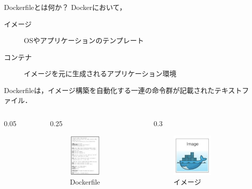 \documentclass[dvipdfmx, 12pt]{beamer}
\newlength{\mytotalwidth}
\newlength{\mycolumnwidth}
\begin{document}
\begin{frame}{Dockerfileとは何か？}
    Dockerにおいて，
    \begin{description}
        \item[イメージ] OSやアプリケーションのテンプレート
        \item[コンテナ] イメージを元に生成されるアプリケーション環境
    \end{description}

    Dockerfileは，イメージ構築を自動化する一連の命令群が記載されたテキストファイル．

    \begin{columns}[totalwidth=\mytotalwidth]
        \begin{column}[T]{0.05\mycolumnwidth}
        \end{column}
        \begin{column}[T]{0.25\mycolumnwidth}
            \begin{figure}
                \centering
                \includegraphics[height=60pt]{img/dockerfile.png}
                \caption{Dockerfile}
            \end{figure}
        \end{column}
        \begin{column}[T]{0.3\mycolumnwidth}
            \begin{figure}
                \centering
                \includegraphics[height=60pt]{img/image.png}
                \caption{イメージ}
            \end{figure}
        \end{column}
\end{columns}
\end{frame}
\end{document}
